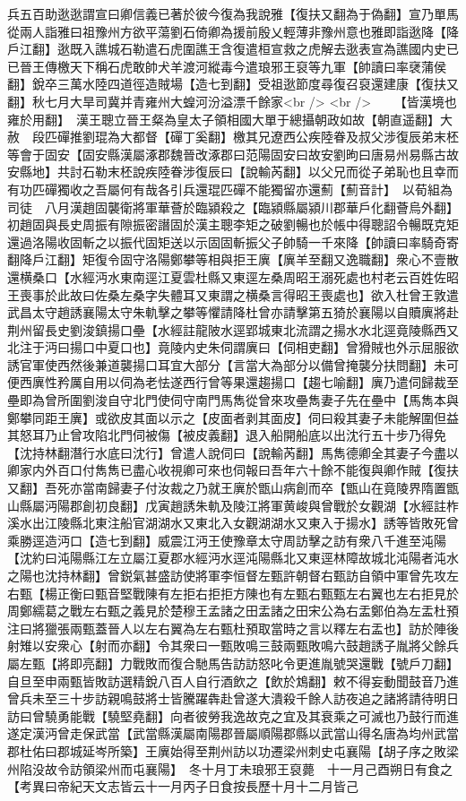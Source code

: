 兵五百助逖逖謂宣曰卿信義已著於彼今復為我說雅【復扶又翻為于偽翻】宣乃單馬從兩人詣雅曰祖豫州方欲平蕩劉石倚卿為援前殷乂輕薄非豫州意也雅即詣逖降【降戶江翻】逖既入譙城石勒遣石虎圍譙王含復遣桓宣救之虎解去逖表宣為譙國内史已已晉王傳檄天下稱石虎敢帥犬羊渡河縱毒今遣琅邪王裒等九軍【帥讀曰率裦蒲侯翻】銳卒三萬水陸四道徑造賊場【造七到翻】受祖逖節度尋復召裒還建康【復扶又翻】秋七月大旱司冀并青雍州大蝗河汾溢漂千餘家<br />
<br />
　　【皆漢境也雍於用翻】　漢王聰立晉王粲為皇太子領相國大單于總攝朝政如故【朝直遥翻】大赦　段匹磾推劉琨為大都督【磾丁奚翻】檄其兄遼西公疾陸眷及叔父涉復辰弟末柸等會于固安【固安縣漢屬涿郡魏晉改涿郡曰范陽固安曰故安劉昫曰唐易州易縣古故安縣地】共討石勒末柸說疾陸眷涉復辰曰【說輸芮翻】以父兄而從子弟恥也且幸而有功匹磾獨收之吾屬何有哉各引兵還琨匹磾不能獨留亦還薊【薊音計】　以荀組為司徒　八月漢趙固襲衛將軍華薈於臨潁殺之【臨潁縣屬潁川郡華戶化翻薈烏外翻】　初趙固與長史周振有隙振密譖固於漢主聰李矩之破劉暢也於帳中得聰詔令暢既克矩還過洛陽收固斬之以振代固矩送以示固固斬振父子帥騎一千來降【帥讀曰率騎奇寄翻降戶江翻】矩復令固守洛陽鄭攀等相與拒王廙【廙羊至翻又逸職翻】衆心不壹散還横桑口【水經沔水東南逕江夏雲杜縣又東逕左桑周昭王溺死處也村老云百姓佐昭王喪事於此故曰佐桑左桑字失體耳又東謂之横桑言得昭王喪處也】欲入杜曾王敦遣武昌太守趙誘襄陽太守朱軌擊之攀等懼請降杜曾亦請擊第五猗於襄陽以自贖廙將赴荆州留長史劉浚鎮揚口壘【水經註龍陂水逕郢城東北流謂之揚水水北逕竟陵縣西又北注于沔曰揚口中夏口也】竟陵内史朱伺謂廙曰【伺相吏翻】曾猾賊也外示屈服欲誘官軍使西然後兼道襲揚口耳宜大部分【言當大為部分以備曾掩襲分扶問翻】未可便西廙性矜厲自用以伺為老怯遂西行曾等果還趨揚口【趨七喻翻】廙乃遣伺歸裁至壘即為曾所圍劉浚自守北門使伺守南門馬雋從曾來攻壘雋妻子先在壘中【馬雋本與鄭攀同距王廙】或欲皮其面以示之【皮面者剥其面皮】伺曰殺其妻子未能解圍但益其怒耳乃止曾攻陷北門伺被傷【被皮義翻】退入船開船底以出沈行五十步乃得免【沈持林翻潛行水底曰沈行】曾遣人說伺曰【說輸芮翻】馬雋德卿全其妻子今盡以卿家内外百口付雋雋已盡心收視卿可來也伺報曰吾年六十餘不能復與卿作賊【復扶又翻】吾死亦當南歸妻子付汝裁之乃就王廙於甑山病創而卒【甑山在竟陵界隋置甑山縣屬沔陽郡創初良翻】戊寅趙誘朱軌及陵江將軍黄峻與曾戰於女觀湖【水經註柞溪水出江陵縣北東注船官湖湖水又東北入女觀湖湖水又東入于揚水】誘等皆敗死曾乘勝逕造沔口【造七到翻】威震江沔王使豫章太守周訪擊之訪有衆八千進至沌陽【沈約曰沌陽縣江左立屬江夏郡水經沔水逕沌陽縣北又東逕林障故城北沌陽者沌水之陽也沈持林翻】曾鋭氣甚盛訪使將軍李恒督左甄許朝督右甄訪自領中軍曾先攻左右甄【楊正衡曰甄音堅戰陳有左拒右拒拒方陳也有左甄右甄甄左右翼也左右拒見於周鄭繻葛之戰左右甄之義見於楚穆王孟諸之田盂諸之田宋公為右盂鄭伯為左盂杜預注曰將獵張兩甄蓋晉人以左右翼為左右甄杜預取當時之言以釋左右盂也】訪於陣後射雉以安衆心【射而亦翻】令其衆曰一甄敗鳴三鼓兩甄敗鳴六鼓趙誘子胤將父餘兵屬左甄【將即亮翻】力戰敗而復合馳馬告訪訪怒叱令更進胤號哭還戰【號戶刀翻】自旦至申兩甄皆敗訪選精銳八百人自行酒飲之【飲於鴆翻】敕不得妄動聞鼓音乃進曾兵未至三十步訪親鳴鼓將士皆騰躍犇赴曾遂大潰殺千餘人訪夜追之諸將請待明日訪曰曾驍勇能戰【驍堅堯翻】向者彼勞我逸故克之宜及其衰乘之可滅也乃鼓行而進遂定漢沔曾走保武當【武當縣漢屬南陽郡晉屬順陽郡縣以武當山得名唐為均州武當郡杜佑曰郡城延岑所築】王廙始得至荆州訪以功遷梁州刺史屯襄陽【胡子序之敗梁州陷没故令訪領梁州而屯襄陽】　冬十月丁未琅邪王裒薨　十一月己酉朔日有食之　【考異曰帝紀天文志皆云十一月丙子日食按長歷十月十二月皆己